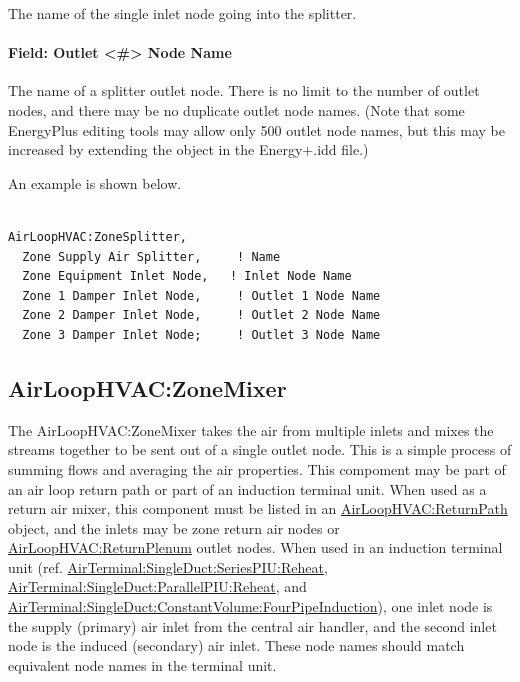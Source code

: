 The name of the single inlet node going into the splitter.

\paragraph{Field: Outlet \textless{}\#\textgreater{} Node Name}\label{field-outlet-node-name-2}

The name of a splitter outlet node. There is no limit to the number of outlet nodes, and there may be no duplicate outlet node names. (Note that some EnergyPlus editing tools may allow only 500 outlet node names, but this may be increased by extending the object in the Energy+.idd file.)

An example is shown below.

\begin{lstlisting}

AirLoopHVAC:ZoneSplitter,
  Zone Supply Air Splitter,     ! Name
  Zone Equipment Inlet Node,   ! Inlet Node Name
  Zone 1 Damper Inlet Node,     ! Outlet 1 Node Name
  Zone 2 Damper Inlet Node,     ! Outlet 2 Node Name
  Zone 3 Damper Inlet Node;     ! Outlet 3 Node Name
\end{lstlisting}

\subsection{AirLoopHVAC:ZoneMixer}\label{airloophvaczonemixer}

The AirLoopHVAC:ZoneMixer takes the air from multiple inlets and mixes the streams together to be sent out of a single outlet node. This is a simple process of summing flows and averaging the air properties. This compoment may be part of an air loop return path or part of an induction terminal unit. When used as a return air mixer, this component must be listed in an \hyperref[airloophvacreturnpath]{AirLoopHVAC:ReturnPath} object, and the inlets may be zone return air nodes or \hyperref[airloophvacreturnplenum]{AirLoopHVAC:ReturnPlenum} outlet nodes. When used in an induction terminal unit (ref. \hyperref[airterminalsingleductseriespiureheat]{AirTerminal:SingleDuct:SeriesPIU:Reheat}, \hyperref[airterminalsingleductparallelpiureheat]{AirTerminal:SingleDuct:ParallelPIU:Reheat}, and \hyperref[airterminalsingleductconstantvolumefourpipeinduction]{AirTerminal:SingleDuct:ConstantVolume:FourPipeInduction}), one inlet node is the supply (primary) air inlet from the central air handler, and the second inlet node is the induced (secondary) air inlet. These node names should match equivalent node names in the terminal unit.

